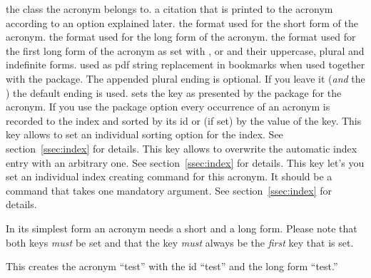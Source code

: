 \documentclass[DIV10,toc=index,toc=bib,hyperfootnotes=false]{cnpkgdoc}
\makeatletter
\newcommand*\sinceversion[1]{%
  \@bsphack
  \marginnote{%
    \footnotesize\sffamily\RaggedRight
    \textcolor{black!75}{Introduced in version~#1}}%
  \@esphack}
\makeatother
\begin{document}
\begin{beschreibung}
 \newline
   the class the acronym belongs to.
 \newline
   a citation that is printed to the acronym according to an option explained later.
 \newline
   the format used for the short form of the acronym.
 \newline
   the format used for the long form of the acronym.
 \newline
   the format used for the first long form of the acronym as set with ,
    or  and their uppercase, plural and indefinite forms.
 \newline
   used as \acs{pdf} string replacement in bookmarks when used together with the
    package. The appended plural ending is optional. If you
   leave it (\emph{and} the \code{/}) the default ending is used.
 \newline
   sets the  key as presented by the  package
   for the acronym.
 \newline
   \sinceversion{1.1}If you use the package option  every occurrence
   of an acronym is recorded to the index and sorted by its \ac{id} or (if set)
   by the value of the  key. This key allows to set an individual
   sorting option for the index. See section~\ref{ssec:index} for details.
 \newline
   \sinceversion{1.1}This key allows to overwrite the automatic index entry with
   an arbitrary one. See section~\ref{ssec:index} for details.
 \newline
   \sinceversion{1.1}This key let's you set an individual index creating command
   for this acronym. It should be a command that takes one mandatory argument.
   See section~\ref{ssec:index} for details.
\end{beschreibung}

In its simplest form an acronym needs a short and a long form. Please note that
both keys \emph{must} be set and that the  key \emph{must} always be
the \emph{first} key that is set.
\begin{beispiel}
\end{beispiel}
This creates the acronym ``\acs{test}'' with the \acs{id} ``test'' and the long
form ``\acl{test}.''
\end{document}
